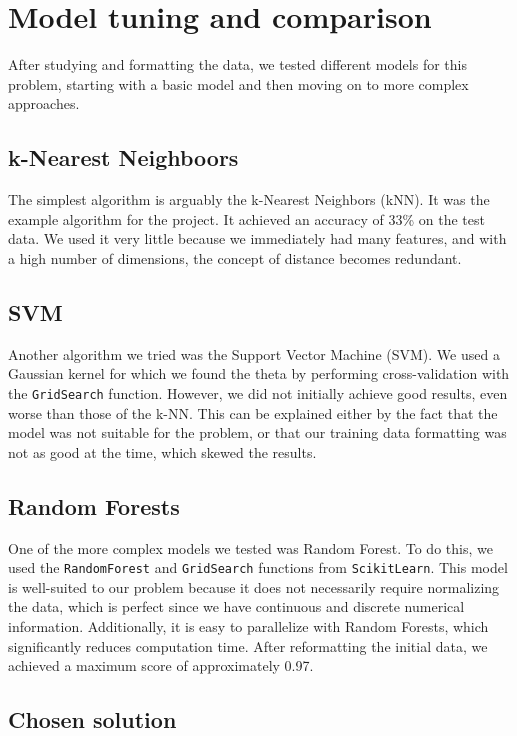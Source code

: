 \section{Model tuning and comparison}

After studying and formatting the data, we tested different models for this problem, starting with a basic model and then moving on to more complex approaches.

\subsection{k-Nearest Neighboors}

The simplest algorithm is arguably the k-Nearest Neighbors (kNN). It was the example algorithm for the project. It achieved an accuracy of 33\% on the test data. We used it very little because we immediately had many features, and with a high number of dimensions, the concept of distance becomes redundant.

\subsection{SVM}

Another algorithm we tried was the Support Vector Machine (SVM). We used a Gaussian kernel for which we found the theta by performing cross-validation with the \texttt{GridSearch} function. However, we did not initially achieve good results, even worse than those of the k-NN. This can be explained either by the fact that the model was not suitable for the problem, or that our training data formatting was not as good at the time, which skewed the results.

\subsection{Random Forests}

One of the more complex models we tested was Random Forest. To do this, we used the \texttt{RandomForest} and \texttt{GridSearch} functions from \texttt{ScikitLearn}. This model is well-suited to our problem because it does not necessarily require normalizing the data, which is perfect since we have continuous and discrete numerical information. Additionally, it is easy to parallelize with Random Forests, which significantly reduces computation time. After reformatting the initial data, we achieved a maximum score of approximately 0.97.

\subsection{Chosen solution}

